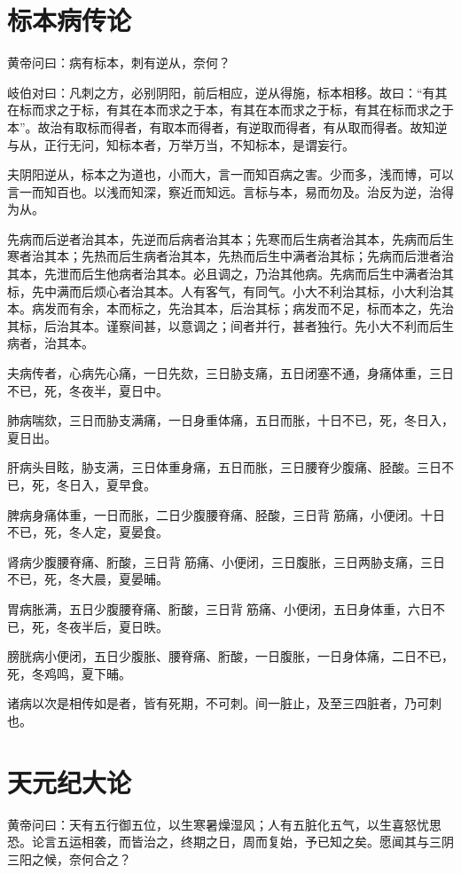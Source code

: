 \documentclass{article}%
\begin{document}
\section{标本病传论}
黄帝问曰：病有标本，刺有逆从，奈何？

岐伯对曰：凡刺之方，必别阴阳，前后相应，逆从得施，标本相移。故曰：“有其在标而求之于标，有其在本而求之于本，有其在本而求之于标，有其在标而求之于本”。故治有取标而得者，有取本而得者，有逆取而得者，有从取而得者。故知逆与从，正行无问，知标本者，万举万当，不知标本，是谓妄行。

夫阴阳逆从，标本之为道也，小而大，言一而知百病之害。少而多，浅而博，可以言一而知百也。以浅而知深，察近而知远。言标与本，易而勿及。治反为逆，治得为从。

先病而后逆者治其本，先逆而后病者治其本；先寒而后生病者治其本，先病而后生寒者治其本；先热而后生病者治其本，先热而后生中满者治其标；先病而后泄者治其本，先泄而后生他病者治其本。必且调之，乃治其他病。先病而后生中满者治其标，先中满而后烦心者治其本。人有客气，有同气。小大不利治其标，小大利治其本。病发而有余，本而标之，先治其本，后治其标；病发而不足，标而本之，先治其标，后治其本。谨察间甚，以意调之；间者并行，甚者独行。先小大不利而后生病者，治其本。

夫病传者，心病先心痛，一日先欬，三日胁支痛，五日闭塞不通，身痛体重，三日不已，死，冬夜半，夏日中。

肺病喘欬，三日而胁支满痛，一日身重体痛，五日而胀，十日不已，死，冬日入，夏日出。

肝病头目眩，胁支满，三日体重身痛，五日而胀，三日腰脊少腹痛、胫酸。三日不已，死，冬日入，夏早食。

脾病身痛体重，一日而胀，二日少腹腰脊痛、胫酸，三日背𦛗筋痛，小便闭。十日不已，死，冬人定，夏晏食。

肾病少腹腰脊痛、胻酸，三日背𦛗筋痛、小便闭，三日腹胀，三日两胁支痛，三日不已，死，冬大晨，夏晏晡。

胃病胀满，五日少腹腰脊痛、胻酸，三日背𦛗筋痛、小便闭，五日身体重，六日不已，死，冬夜半后，夏日昳。

膀胱病小便闭，五日少腹胀、腰脊痛、胻酸，一日腹胀，一日身体痛，二日不已，死，冬鸡鸣，夏下晡。

诸病以次是相传如是者，皆有死期，不可刺。间一脏止，及至三四脏者，乃可刺也。
\section{天元纪大论}
黄帝问曰：天有五行御五位，以生寒暑燥湿风；人有五脏化五气，以生喜怒忧思恐。论言五运相袭，而皆治之，终期之日，周而复始，予已知之矣。愿闻其与三阴三阳之候，奈何合之？
\end{document}
